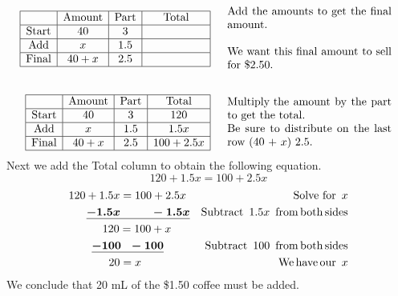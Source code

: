 \begin{example}
	\begin{eqnarray*}
	   \begin{array}{|c|c|c|c|}
      \hline
      & \tmop{Amount} & \tmop{Part} & \tmop{Total}\\
      \hline
      \tmop{Start} & 40 & 3 & \mbox{\hspace{.70in}}\\
      \hline
      \tmop{Add} & x & 1.5 & \\
      \hline
      \tmop{Final} & 40 + x & 2.5 & \\
      \hline
    \end{array} &  & \begin{array}{p{0.425\textwidth}}
      \tmop{Add} \tmop{the} \tmop{amounts} \tmop{to} \tmop{get} \tmop{the}
      \tmop{final} \tmop{amount}.\pp
      \tmop{We} \tmop{want} \tmop{this} \tmop{final} \tmop{amount} \tmop{to}
      \tmop{sell} \tmop{for} \$2.50.
    \end{array}\\
    &  & \\
    \begin{array}{|c|c|c|c|}
      \hline
      & \tmop{Amount} & \tmop{Part} & \tmop{Total}\\
      \hline
      \tmop{Start} & 40 & 3 & 120\\
      \hline
      \tmop{Add} & x & 1.5 & 1.5 x\\
      \hline
      \tmop{Final} & 40 + x & 2.5 & 100 + 2.5 x\\
      \hline
    \end{array} &  & \begin{array}{p{0.425\textwidth}}
      \tmop{Multiply~the} \tmop{amount} \tmop{by} \tmop{the} \tmop{part} \tmop{to} \tmop{get}
      \tmop{the~total}.\\
      \tmop{Be} \tmop{sure} \tmop{to} \tmop{distribute} \tmop{on} \tmop{the}
      \tmop{last} \tmop{row} (40 + $x$) 2.5.
    \end{array}\\
\end{eqnarray*}
Next we add the Total column to obtain the following equation.
$$120 + 1.5 x = 100 + 2.5 x$$
\begin{eqnarray*}
    120 + 1.5 x = 100 + 2.5 x~ & & \operatorname{Solve~for~} x\\
		\boldsymbol{\underline{- 1.5 x ~~~~~~~~- 1.5 x}} &  & \operatorname{Subtract~} 1.5 x \operatorname{~from} \operatorname{both}
    \operatorname{sides}\\
    120 = 100 + x~~~~~ &  & \\
    \boldsymbol{\underline{- 100 ~~- 100}}~~~~~~~ &  & \operatorname{Subtract~} 100 \operatorname{~from} \operatorname{both}
    \operatorname{sides}\\
    20 = x~~~~~~~~~~~~~ &  & \operatorname{We} \operatorname{have} \operatorname{our~} x
\end{eqnarray*}
We conclude that 20 mL of the \$1.50 coffee must be added.
\end{example}

